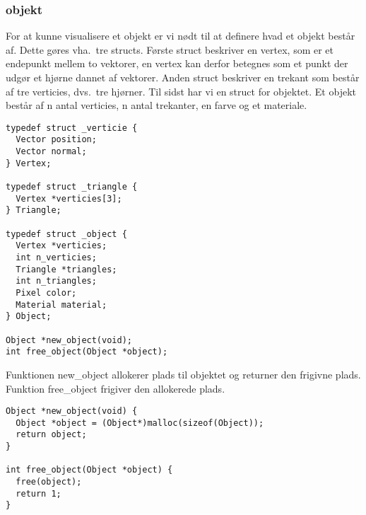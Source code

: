 \subsubsection{objekt}
For at kunne visualisere et objekt er vi nødt til at definere hvad et objekt består af. Dette gøres vha.\ tre structs. Første struct beskriver en vertex, som er et endepunkt mellem to vektorer, en vertex kan derfor betegnes som et punkt der udgør et hjørne dannet af vektorer. Anden struct beskriver en trekant som består af tre verticies, dvs.\ tre hjørner. Til sidst har vi en struct for objektet. Et objekt består af n antal verticies, n antal trekanter, en farve og et materiale. 

\begin{lstlisting}[style=Cstyle, caption=Objekter]
typedef struct _verticie {
  Vector position;
  Vector normal;
} Vertex;

typedef struct _triangle {
  Vertex *verticies[3];
} Triangle;

typedef struct _object {
  Vertex *verticies;
  int n_verticies;
  Triangle *triangles;
  int n_triangles;
  Pixel color;
  Material material;
} Object;

Object *new_object(void);
int free_object(Object *object);
\end{lstlisting}

Funktionen new\_object allokerer plads til objektet og returner den frigivne plads. Funktion free\_object frigiver den allokerede plads. 
\begin{lstlisting}[style=Cstyle, caption=Funktionerne]
Object *new_object(void) {
  Object *object = (Object*)malloc(sizeof(Object));
  return object;
}

int free_object(Object *object) {
  free(object);
  return 1;
}
\end{lstlisting}



